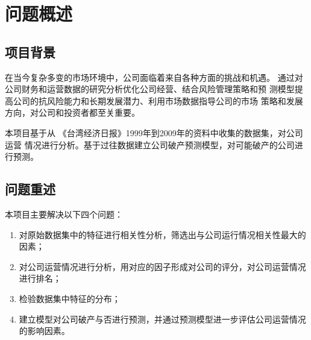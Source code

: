 \section{问题概述}
\subsection{项目背景}
\par 在当今复杂多变的市场环境中，公司面临着来自各种方面的挑战和机遇。
通过对公司财务和运营数据的研究分析优化公司经营、结合风险管理策略和预
测模型提高公司的抗风险能力和长期发展潜力、利用市场数据指导公司的市场
策略和发展方向，对公司和投资者都至关重要。
\par 本项目基于从
《台湾经济日报》1999年到2009年的资料中收集的数据集，对公司运营
情况进行分析。基于过往数据建立公司破产预测模型，对可能破产的公司进行预测。

\subsection{问题重述}
\noindent
本项目主要解决以下四个问题：
\begin{enumerate}
    \item 对原始数据集中的特征进行相关性分析，筛选出与公司运行情况相关性最大的因素；
    \item 对公司运营情况进行分析，用对应的因子形成对公司的评分，对公司运营情况进行排名；
    \item 检验数据集中特征的分布；
    \item 建立模型对公司破产与否进行预测，并通过预测模型进一步评估公司运营情况的影响因素。
\end{enumerate}